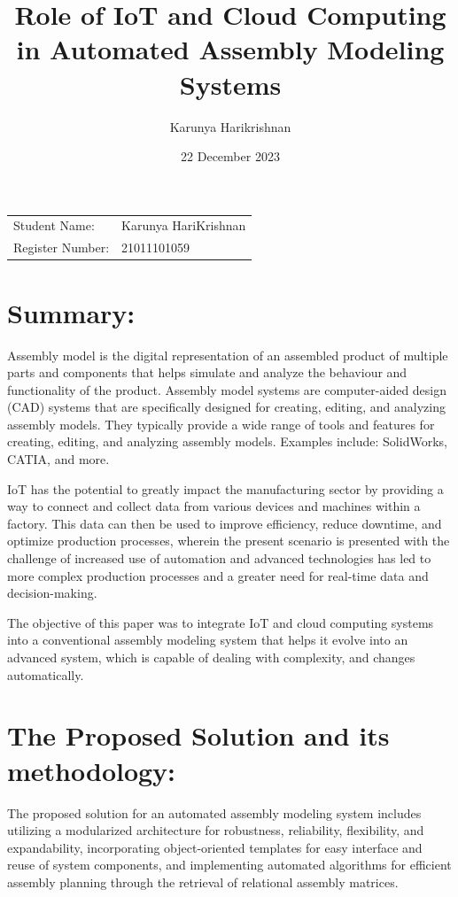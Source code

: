 \documentclass{article}
\title{Role of IoT and Cloud Computing in Automated Assembly Modeling Systems
}
\author{Karunya Harikrishnan}
\date{22 December 2023}
\begin{document}
\maketitle

\noindent\begin{tabular}{@{}ll}
    Student Name: & Karunya HariKrishnan\\
    Register Number: & 21011101059
    
     
\end{tabular}

\section*{Summary:}
Assembly model is the digital representation of an assembled product of multiple parts and components that helps simulate and analyze the behaviour and functionality of the product. Assembly model systems are computer-aided design (CAD) systems that are specifically designed for creating, editing, and analyzing assembly models. They typically provide a wide range of tools and features for creating, editing, and analyzing assembly models. 
Examples include: SolidWorks, CATIA, and more.

IoT has the potential to greatly impact the manufacturing sector by providing a way to connect and collect data from various devices and machines within a factory. This data can then be used to improve efficiency, reduce downtime, and optimize production processes, wherein the present  scenario is presented with the challenge of  increased use of automation and advanced technologies has led to more complex production processes and a greater need for real-time data and decision-making.

The objective of this paper was to integrate IoT and cloud computing systems into a conventional assembly modeling system that helps it evolve
into an advanced system, which is capable of dealing with complexity,
and changes automatically.

\section*{The Proposed Solution and its methodology:}
The proposed solution for an automated assembly modeling system includes utilizing a modularized architecture for robustness, reliability, flexibility, and expandability, incorporating object-oriented templates for easy interface and reuse of system components, and implementing automated algorithms for efficient assembly planning through the retrieval of relational assembly matrices.
\end{document}
